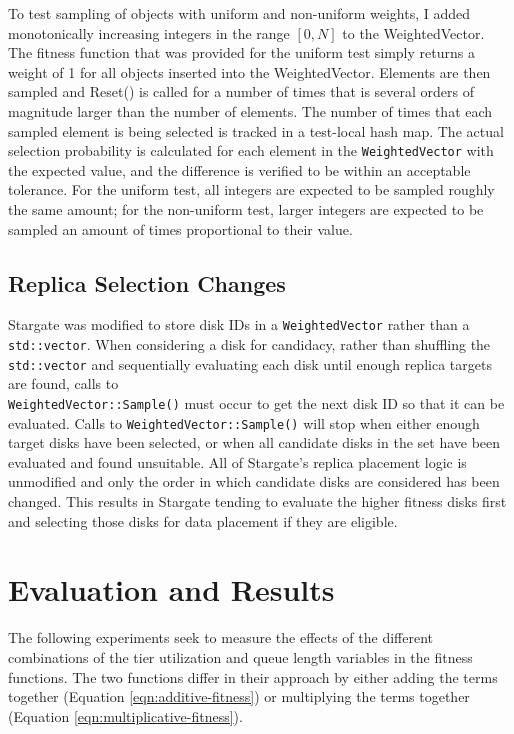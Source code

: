 \documentclass[12pt]{article}
\begin{document}
    To test sampling of objects with uniform and non-uniform weights, I added
    monotonically increasing integers in the range $[0,N]$ to the
    WeightedVector. The fitness function that was provided for the uniform test
    simply returns a weight of 1 for all objects inserted into the
    WeightedVector.  Elements are then sampled and Reset() is called for a
    number of times that is several orders of magnitude larger than the number
    of elements. The number of times that each sampled element is being
    selected is tracked in a test-local hash map. The actual selection
    probability is calculated for each element in the \texttt{WeightedVector}
    with the expected value, and the difference is verified to be within an
    acceptable tolerance. For the uniform test, all integers are expected to be
    sampled roughly the same amount; for the non-uniform test, larger integers
    are expected to be sampled an amount of times proportional to their value.

  \subsection{Replica Selection Changes}
    
  Stargate was modified to store disk IDs in a \texttt{WeightedVector} rather
  than a \texttt{std::vector}. When considering a disk for candidacy, rather
  than shuffling the \texttt{std::vector} and sequentially evaluating each disk
  until enough replica targets are found, calls to \\
  \texttt{WeightedVector::Sample()} must occur to get the next disk ID so that
  it can be evaluated. Calls to \texttt{WeightedVector::Sample()} will stop
  when either enough target disks have been selected, or when all candidate
  disks in the set have been evaluated and found  unsuitable.  All of
  Stargate's replica placement logic is unmodified and only the order in which
  candidate disks are considered has been changed. This results in Stargate
  tending to evaluate the higher fitness disks first and selecting those disks
  for data placement if they are eligible.
      

\newpage
\FloatBarrier
\section{Evaluation and Results}

The following experiments seek to measure the effects of the different
combinations of the tier utilization and queue length variables in the fitness
functions. The two functions differ in their approach by either adding the
terms together (Equation \ref{eqn:additive-fitness}) or multiplying the terms
together (Equation \ref{eqn:multiplicative-fitness}).
\end{document}
